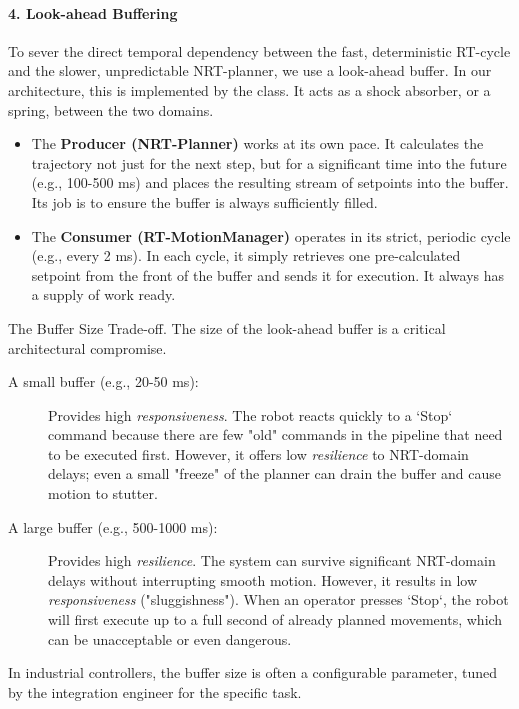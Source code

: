 \paragraph{4. Look-ahead Buffering}
To sever the direct temporal dependency between the fast, deterministic RT-cycle and the slower, unpredictable NRT-planner, we use a look-ahead buffer. In our architecture, this is implemented by the  class. It acts as a shock absorber, or a spring, between the two domains.
\begin{itemize}
    \item The \textbf{Producer (NRT-Planner)} works at its own pace. It calculates the trajectory not just for the next step, but for a significant time into the future (e.g., 100-500 ms) and places the resulting stream of setpoints into the buffer. Its job is to ensure the buffer is always sufficiently filled.
    \item The \textbf{Consumer (RT-MotionManager)} operates in its strict, periodic cycle (e.g., every 2 ms). In each cycle, it simply retrieves one pre-calculated setpoint from the front of the buffer and sends it for execution. It always has a supply of work ready.
\end{itemize}

\begin{tipbox}{The Buffer Size Trade-off.}
    The size of the look-ahead buffer is a critical architectural compromise.
    \begin{description}
        \item[A small buffer (e.g., 20-50 ms):] Provides high \textit{responsiveness}. The robot reacts quickly to a `Stop` command because there are few "old" commands in the pipeline that need to be executed first. However, it offers low \textit{resilience} to NRT-domain delays; even a small "freeze" of the planner can drain the buffer and cause motion to stutter.
        \item[A large buffer (e.g., 500-1000 ms):] Provides high \textit{resilience}. The system can survive significant NRT-domain delays without interrupting smooth motion. However, it results in low \textit{responsiveness} ("sluggishness"). When an operator presses `Stop`, the robot will first execute up to a full second of already planned movements, which can be unacceptable or even dangerous.
    \end{description}
    In industrial controllers, the buffer size is often a configurable parameter, tuned by the integration engineer for the specific task.
\end{tipbox}

